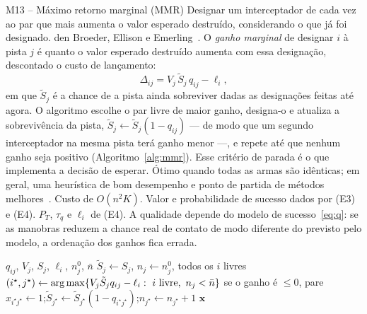 \begin{metodo}{M13 -- Máximo retorno marginal (MMR)}
\ideia Designar um interceptador de cada vez ao par que mais aumenta o valor esperado destruído, considerando o que já
foi designado.
\orig den Broeder, Ellison e Emerling~\cite{denbroeder1959}.
\func O \emph{ganho marginal} de designar $i$ à pista $j$ é quanto o valor esperado destruído aumenta com essa designação,
descontado o custo de lançamento:
\begin{equation}
  \Delta_{ij}=V_j\,\tilde S_j\,q_{ij}-\ell_i,
  \label{eq:mmr}
\end{equation}
em que $\tilde S_j$ é a chance de a pista ainda sobreviver dadas as designações feitas até agora. O algoritmo escolhe o par
livre de maior ganho, designa-o e atualiza a sobrevivência da pista, $\tilde S_j\leftarrow\tilde S_j(1-q_{ij})$ --- de modo
que um segundo interceptador na mesma pista terá ganho menor ---, e repete até que nenhum ganho seja positivo
(Algoritmo~\ref{alg:mmr}). Esse critério de parada é o que implementa a decisão de esperar.
\prop Ótimo quando todas as armas são idênticas; em geral, uma heurística de bom desempenho e ponto de partida de métodos
melhores~\cite{ahuja2007}. Custo de $O(n^2K)$.
\adap Valor e probabilidade de sucesso dados por (E3) e (E4).
\parm $P_T$, $\tau_q$ e $\ell_i$ de (E4).
\espera A qualidade depende do modelo de sucesso~\eqref{eq:q}: se as manobras reduzem a chance real de contato de modo
diferente do previsto pelo modelo, a ordenação dos ganhos fica errada.
\end{metodo}

\begin{algorithm}[H]
\caption{Máximo retorno marginal (M13).}\label{alg:mmr}
\begin{algorithmic}[1]
\Require $q_{ij}$, $V_j$, $S_j$, $\ell_i$, $n_j^0$, $\bar n$
\State $\tilde S_j\gets S_j$, $n_j\gets n_j^0$, todos os $i$ livres
\Loop
  \State $(i^\star,j^\star)\gets\operatorname*{arg\,max}\{V_j\tilde S_jq_{ij}-\ell_i:\ i\text{ livre},\ n_j<\bar n\}$
  \State se o ganho é $\le0$, pare
  \State $x_{i^\star j^\star}\gets1$;\quad $\tilde S_{j^\star}\gets\tilde S_{j^\star}(1-q_{i^\star j^\star})$;\quad $n_{j^\star}\gets n_{j^\star}+1$
\EndLoop
\Ensure $\bm{x}$
\end{algorithmic}
\end{algorithm}

